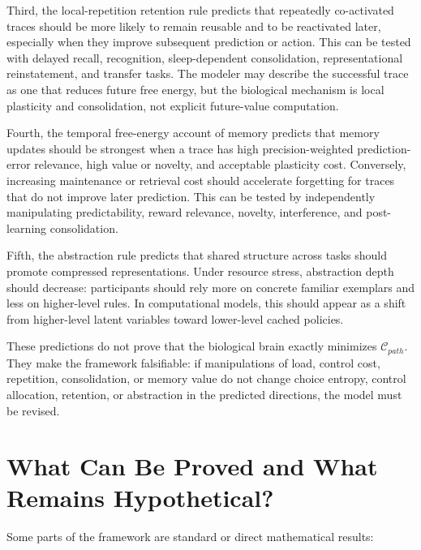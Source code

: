 \documentclass[11pt, a4paper]{article}
\begin{document}
Third, the local-repetition retention rule predicts that repeatedly co-activated traces should be more likely to remain reusable and to be reactivated later, especially when they improve subsequent prediction or action. This can be tested with delayed recall, recognition, sleep-dependent consolidation, representational reinstatement, and transfer tasks. The modeler may describe the successful trace as one that reduces future free energy, but the biological mechanism is local plasticity and consolidation, not explicit future-value computation.

Fourth, the temporal free-energy account of memory predicts that memory updates should be strongest when a trace has high precision-weighted prediction-error relevance, high value or novelty, and acceptable plasticity cost. Conversely, increasing maintenance or retrieval cost should accelerate forgetting for traces that do not improve later prediction. This can be tested by independently manipulating predictability, reward relevance, novelty, interference, and post-learning consolidation.

Fifth, the abstraction rule predicts that shared structure across tasks should promote compressed representations. Under resource stress, abstraction depth should decrease: participants should rely more on concrete familiar exemplars and less on higher-level rules. In computational models, this should appear as a shift from higher-level latent variables toward lower-level cached policies.

These predictions do not prove that the biological brain exactly minimizes $\mathcal{C}_{path}$. They make the framework falsifiable: if manipulations of load, control cost, repetition, consolidation, or memory value do not change choice entropy, control allocation, retention, or abstraction in the predicted directions, the model must be revised.

\section{What Can Be Proved and What Remains Hypothetical?}

Some parts of the framework are standard or direct mathematical results:
\end{document}
